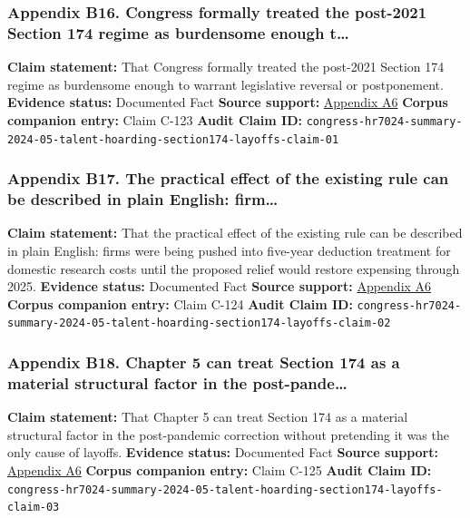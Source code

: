 \documentclass[
  american,
  11pt,
  letterpaper,
]{article}
\begin{document}
\subsubsection{Appendix B16. Congress formally treated the post-2021
Section 174 regime as burdensome enough
t\ldots{}}\label{appendix-b16-congress-formally-treated-the-post-2021-section-174-regime-as-burdensome-enough-t}

\textbf{Claim statement:} That Congress formally treated the post-2021
Section 174 regime as burdensome enough to warrant legislative reversal
or postponement. \textbf{Evidence status:} Documented Fact
\textbf{Source support:}
\hyperref[appendix-a6-h-r-7024-tax-relief-for-american-families-and-workers-act-of-2024-crs-summary]{Appendix
A6} \textbf{Corpus companion entry:} Claim C-123 \textbf{Audit Claim
ID:}
\texttt{congress-hr7024-summary-2024-05-talent-hoarding-section174-layoffs-claim-01}

\subsubsection{Appendix B17. The practical effect of the existing rule
can be described in plain English:
firm\ldots{}}\label{appendix-b17-the-practical-effect-of-the-existing-rule-can-be-described-in-plain-english-firm}

\textbf{Claim statement:} That the practical effect of the existing rule
can be described in plain English: firms were being pushed into
five-year deduction treatment for domestic research costs until the
proposed relief would restore expensing through 2025. \textbf{Evidence
status:} Documented Fact \textbf{Source support:}
\hyperref[appendix-a6-h-r-7024-tax-relief-for-american-families-and-workers-act-of-2024-crs-summary]{Appendix
A6} \textbf{Corpus companion entry:} Claim C-124 \textbf{Audit Claim
ID:}
\texttt{congress-hr7024-summary-2024-05-talent-hoarding-section174-layoffs-claim-02}

\subsubsection{Appendix B18. Chapter 5 can treat Section 174 as a
material structural factor in the
post-pande\ldots{}}\label{appendix-b18-chapter-5-can-treat-section-174-as-a-material-structural-factor-in-the-post-pande}

\textbf{Claim statement:} That Chapter 5 can treat Section 174 as a
material structural factor in the post-pandemic correction without
pretending it was the only cause of layoffs. \textbf{Evidence status:}
Documented Fact \textbf{Source support:}
\hyperref[appendix-a6-h-r-7024-tax-relief-for-american-families-and-workers-act-of-2024-crs-summary]{Appendix
A6} \textbf{Corpus companion entry:} Claim C-125 \textbf{Audit Claim
ID:}
\texttt{congress-hr7024-summary-2024-05-talent-hoarding-section174-layoffs-claim-03}
\end{document}
